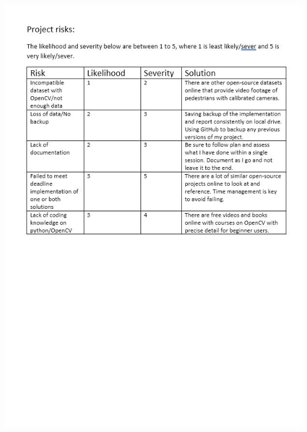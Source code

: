 \documentclass[12pt]{report}
\begin{document}
\includegraphics[width=160mm]{./images/appendix/PDD4.JPG}
\end{document}
